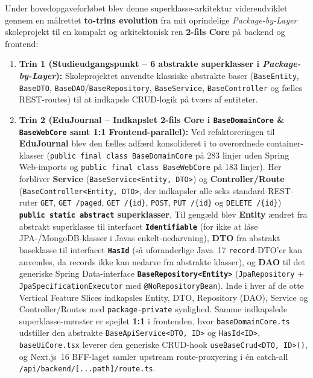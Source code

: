 \documentclass[11pt,a4paper]{article}
\begin{document}
\begin{table}[htbp]
Under hovedopgaveforløbet blev denne superklasse-arkitektur videreudviklet gennem en målrettet \textbf{to-trins evolution} fra mit oprindelige \textit{Package-by-Layer} skoleprojekt til en kompakt og arkitektonisk ren \textbf{2-fils Core} på backend og frontend:
\begin{enumerate}[noitemsep]
    \item \textbf{Trin 1 (Studieudgangspunkt -- 6 abstrakte superklasser i \textit{Package-by-Layer}):} Skoleprojektet anvendte klassiske abstrakte baser (\texttt{BaseEntity}, \texttt{BaseDTO}, \texttt{BaseDAO}/\texttt{BaseRepository}, \texttt{BaseService}, \texttt{BaseController} og fælles REST-routes) til at indkapsle CRUD-logik på tværs af entiteter.
    \item \textbf{Trin 2 (EduJournal -- Indkapslet 2-fils Core i \texttt{BaseDomainCore} \& \texttt{BaseWebCore} samt 1:1 Frontend-parallel):} Ved refaktoreringen til \textbf{EduJournal} blev den fælles adfærd konsolideret i to overordnede container-klasser (\texttt{public final class BaseDomainCore} på 283 linjer uden Spring Web-imports og \texttt{public final class BaseWebCore} på 183 linjer). Her forbliver \textbf{Service} (\texttt{BaseService<Entity, DTO>}) og \textbf{Controller/Route} (\texttt{BaseController<Entity, DTO>}, der indkapsler alle seks standard-REST-ruter \texttt{GET}, \texttt{GET /paged}, \texttt{GET /\{id\}}, \texttt{POST}, \texttt{PUT /\{id\}} og \texttt{DELETE /\{id\}}) \textbf{\texttt{public static abstract} superklasser}. Til gengæld blev \textbf{Entity} ændret fra abstrakt superklasse til interfacet \textbf{\texttt{Identifiable}} (for ikke at låse JPA-/MongoDB-klasser i Javas enkelt-nedarvning), \textbf{DTO} fra abstrakt baseklasse til interfacet \textbf{\texttt{HasId}} (så uforanderlige Java~17 \texttt{record}-DTO'er kan anvendes, da records ikke kan nedarve fra abstrakte klasser), og \textbf{DAO} til det generiske Spring Data-interface \textbf{\texttt{BaseRepository<Entity>}} (\texttt{JpaRepository} + \texttt{JpaSpecificationExecutor} med \texttt{@NoRepositoryBean}). Inde i hver af de otte Vertical Feature Slices indkapsles Entity, DTO, Repository (DAO), Service og Controller/Routes med \texttt{package-private} synlighed. Samme indkapslede superklasse-mønster er spejlet \textbf{1:1} i frontenden, hvor \texttt{baseDomainCore.ts} udstiller den abstrakte \texttt{BaseApiService<DTO, ID>} og \texttt{HasId<ID>}, \texttt{baseUiCore.tsx} leverer den generiske CRUD-hook \texttt{useBaseCrud<DTO, ID>()}, og Next.js~16 BFF-laget samler upstream route-proxyering i én catch-all \texttt{/api/backend/[...path]/route.ts}.
\end{enumerate}


\end{table}
\end{document}
